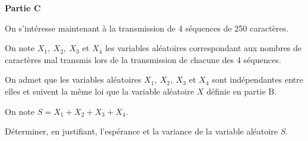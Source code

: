 \medskip

\textbf{Partie C}

\medskip

On s'intéresse maintenant à la transmission de 4 séquences de 250 caractères.

On note $X_1,\: X_2,\: X_3$\: et $X_4$ les variables aléatoires correspondant aux nombres de caractères mal transmis lors de la transmission de chacune des 4 séquences. 

On admet que les variables aléatoires $X_1,\: X_2,\: X_3$\: et $X_4$ sont indépendantes entre elles et suivent la même loi que la variable aléatoire $X$ définie en partie B.

On note $S = X_1 + X_2 + X_3 + X_4.$

Déterminer, en justifiant, l'espérance et la variance de la variable aléatoire $S$.
